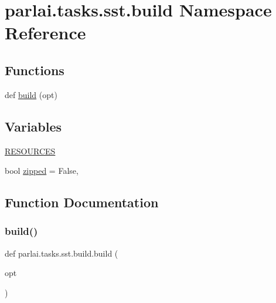 \hypertarget{namespaceparlai_1_1tasks_1_1sst_1_1build}{}\section{parlai.\+tasks.\+sst.\+build Namespace Reference}
\label{namespaceparlai_1_1tasks_1_1sst_1_1build}
\subsection*{Functions}
\begin{DoxyCompactItemize}
\item 
def \hyperlink{namespaceparlai_1_1tasks_1_1sst_1_1build_af9e8461053fb439f9cf6e16c10bd6f63}{build} (opt)
\end{DoxyCompactItemize}
\subsection*{Variables}
\begin{DoxyCompactItemize}
\item 
\hyperlink{namespaceparlai_1_1tasks_1_1sst_1_1build_a2dd5a09775085687309bdec21b8cf7ad}{R\+E\+S\+O\+U\+R\+C\+ES}
\item 
bool \hyperlink{namespaceparlai_1_1tasks_1_1sst_1_1build_a61a03346f350433f532cf63370301032}{zipped} = False,
\end{DoxyCompactItemize}


\subsection{Function Documentation}
\mbox{\label{namespaceparlai_1_1tasks_1_1sst_1_1build_af9e8461053fb439f9cf6e16c10bd6f63}} 
\subsubsection{\texorpdfstring{build()}{build()}}
{\footnotesize\ttfamily def parlai.\+tasks.\+sst.\+build.\+build (\begin{DoxyParamCaption}\item[{}]{opt }\end{DoxyParamCaption})}



